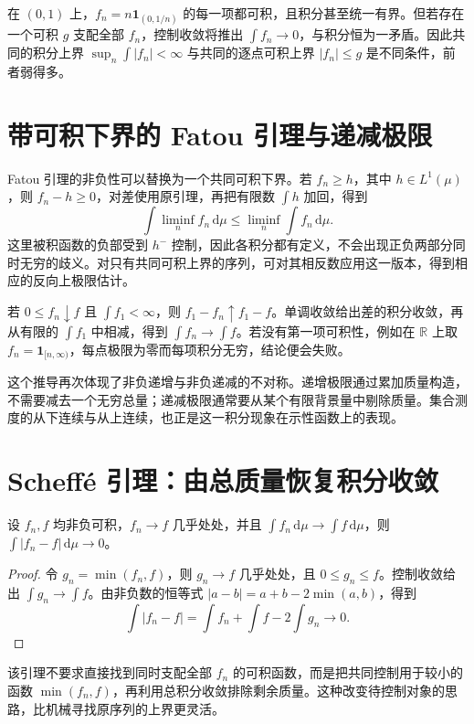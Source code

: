 \begin{example}[不能把各项可积误当成共同控制]
在 $(0,1)$ 上，$f_n=n\mathbf1_{(0,1/n)}$ 的每一项都可积，且积分甚至统一有界。但若存在一个可积 $g$ 支配全部 $f_n$，控制收敛将推出 $\int f_n\to0$，与积分恒为一矛盾。因此共同的积分上界 $\sup_n\int|f_n|<\infty$ 与共同的逐点可积上界 $|f_n|\leq g$ 是不同条件，前者弱得多。
\end{example}

\section{带可积下界的 Fatou 引理与递减极限}
Fatou 引理的非负性可以替换为一个共同可积下界。若 $f_n\geq h$，其中 $h\in L^1(\mu)$，则 $f_n-h\geq0$，对差使用原引理，再把有限数 $\int h$ 加回，得到
\[
 \int\liminf_nf_n\,\mathrm d\mu
 \leq\liminf_n\int f_n\,\mathrm d\mu.
\]
这里被积函数的负部受到 $h^-$ 控制，因此各积分都有定义，不会出现正负两部分同时无穷的歧义。对只有共同可积上界的序列，可对其相反数应用这一版本，得到相应的反向上极限估计。

若 $0\leq f_n\downarrow f$ 且 $\int f_1<\infty$，则 $f_1-f_n\uparrow f_1-f$。单调收敛给出差的积分收敛，再从有限的 $\int f_1$ 中相减，得到 $\int f_n\to\int f$。若没有第一项可积性，例如在 $\mathbb R$ 上取 $f_n=\mathbf1_{[n,\infty)}$，每点极限为零而每项积分无穷，结论便会失败。

这个推导再次体现了非负递增与非负递减的不对称。递增极限通过累加质量构造，不需要减去一个无穷总量；递减极限通常要从某个有限背景量中剔除质量。集合测度的从下连续与从上连续，也正是这一积分现象在示性函数上的表现。

\section{Scheffé 引理：由总质量恢复积分收敛}
\begin{theorem}[Scheffé 引理]
设 $f_n,f$ 均非负可积，$f_n\to f$ 几乎处处，并且 $\int f_n\,\mathrm d\mu\to\int f\,\mathrm d\mu$，则 $\int|f_n-f|\,\mathrm d\mu\to0$。
\label{thm:mt-scheffe}
\end{theorem}
\begin{proof}
令 $g_n=\min(f_n,f)$，则 $g_n\to f$ 几乎处处，且 $0\leq g_n\leq f$。控制收敛给出 $\int g_n\to\int f$。由非负数的恒等式 $|a-b|=a+b-2\min(a,b)$，得到
\[
 \int|f_n-f|=\int f_n+\int f-2\int g_n\longrightarrow0.
\]
\end{proof}
该引理不要求直接找到同时支配全部 $f_n$ 的可积函数，而是把共同控制用于较小的函数 $\min(f_n,f)$，再利用总积分收敛排除剩余质量。这种改变待控制对象的思路，比机械寻找原序列的上界更灵活。

